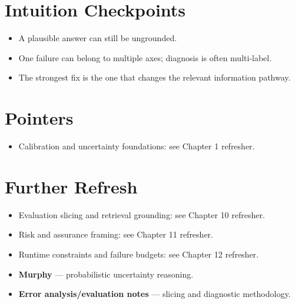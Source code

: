 \section*{Intuition Checkpoints}
\begin{itemize}[leftmargin=1.5em]
  \item A plausible answer can still be ungrounded.
  \item One failure can belong to multiple axes; diagnosis is often multi-label.
  \item The strongest fix is the one that changes the relevant information pathway.
\end{itemize}

\section*{Pointers}
\begin{itemize}[leftmargin=1.5em]
  \item Calibration and uncertainty foundations: see Chapter 1 refresher.
\end{itemize}

\section*{Further Refresh}
\begin{itemize}[leftmargin=1.5em]
  \item Evaluation slicing and retrieval grounding: see Chapter 10 refresher.
  \item Risk and assurance framing: see Chapter 11 refresher.
  \item Runtime constraints and failure budgets: see Chapter 12 refresher.
  \item \textbf{Murphy} --- probabilistic uncertainty reasoning.
  \item \textbf{Error analysis/evaluation notes} --- slicing and diagnostic methodology.
\end{itemize}
